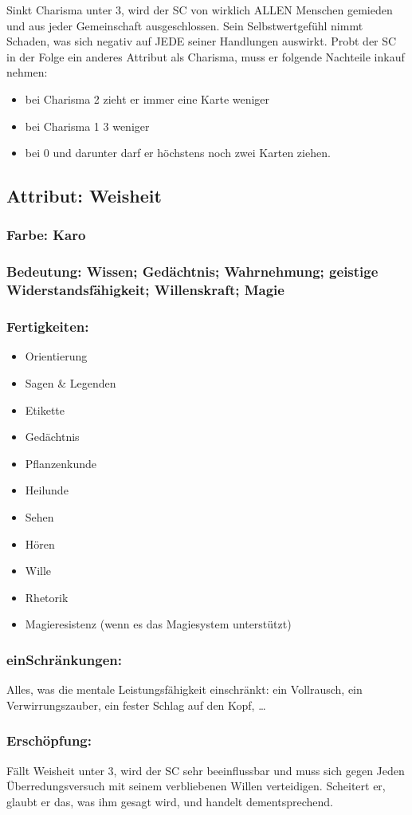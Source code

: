Sinkt Charisma unter 3, wird der SC von wirklich ALLEN Menschen gemieden und aus jeder Gemeinschaft ausgeschlossen. Sein Selbstwertgefühl nimmt Schaden, was sich negativ auf JEDE seiner Handlungen auswirkt. Probt der SC in der Folge ein anderes Attribut als Charisma, muss er folgende Nachteile inkauf nehmen:
\begin{itemize}
\item bei Charisma 2 zieht er immer eine Karte weniger
\item bei Charisma 1 3 weniger
\item bei 0 und darunter darf er höchstens noch zwei Karten ziehen.
\end{itemize}

\subsection{Attribut: Weisheit}

\subsubsection{Farbe: Karo}

\subsubsection{Bedeutung: Wissen; Gedächtnis; Wahrnehmung; geistige Widerstandsfähigkeit; Willenskraft; Magie}

\subsubsection{Fertigkeiten:}
\begin{itemize}
\item Orientierung
\item Sagen \& Legenden
\item Etikette
\item Gedächtnis
\item Pflanzenkunde
\item Heilunde
\item Sehen
\item Hören
\item Wille
\item Rhetorik
\item Magieresistenz (wenn es das Magiesystem unterstützt)
\end{itemize}

\subsubsection{einSchränkungen:}

Alles, was die mentale Leistungsfähigkeit einschränkt: ein Vollrausch, ein Verwirrungszauber, ein fester Schlag auf den Kopf, \dots

\subsubsection{Erschöpfung:}

Fällt Weisheit unter 3, wird der SC sehr beeinflussbar und muss sich gegen Jeden Überredungsversuch mit seinem verbliebenen Willen verteidigen. Scheitert er, glaubt er das, was ihm gesagt wird, und handelt dementsprechend.
